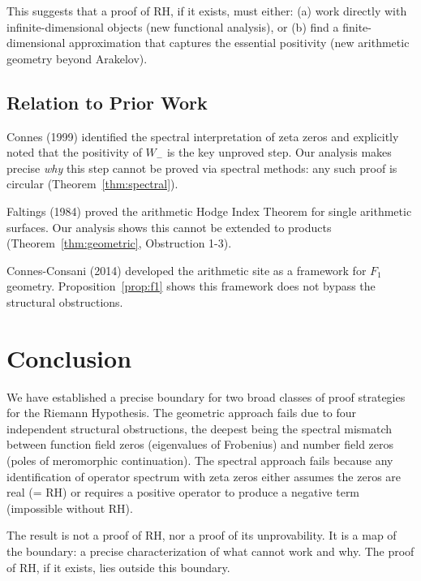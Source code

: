 \documentclass[12pt]{article}
\begin{document}
This suggests that a proof of RH, if it exists, must either:
(a) work directly with infinite-dimensional objects (new functional analysis),
or (b) find a finite-dimensional approximation that captures the essential
positivity (new arithmetic geometry beyond Arakelov).

\subsection{Relation to Prior Work}

Connes (1999) identified the spectral interpretation of zeta zeros and
explicitly noted that the positivity of $W_-$ is the key unproved step.
Our analysis makes precise \emph{why} this step cannot be proved via
spectral methods: any such proof is circular (Theorem~\ref{thm:spectral}).

Faltings (1984) proved the arithmetic Hodge Index Theorem for single
arithmetic surfaces. Our analysis shows this cannot be extended to products
(Theorem~\ref{thm:geometric}, Obstruction 1-3).

Connes-Consani (2014) developed the arithmetic site as a framework for
$F_1$ geometry. Proposition~\ref{prop:f1} shows this framework does not
bypass the structural obstructions.

\section{Conclusion}

We have established a precise boundary for two broad classes of proof
strategies for the Riemann Hypothesis. The geometric approach fails due to
four independent structural obstructions, the deepest being the spectral
mismatch between function field zeros (eigenvalues of Frobenius) and number
field zeros (poles of meromorphic continuation). The spectral approach fails
because any identification of operator spectrum with zeta zeros either
assumes the zeros are real (= RH) or requires a positive operator to produce
a negative term (impossible without RH).

The result is not a proof of RH, nor a proof of its unprovability. It is a
map of the boundary: a precise characterization of what cannot work and why.
The proof of RH, if it exists, lies outside this boundary.
\end{document}

